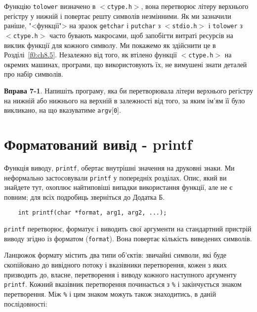 \documentclass[a4paper,12pt]{book}
\begin{document}
  Функцію \texttt{tolower} визначено в \texttt{\mbox{$<$}ctype.h\mbox{$>$}}, вона
  перетворює літеру верхнього регістру у нижній і повертає решту символів незмінними. Як
  ми зазначили раніше, "<функції"> на зразок \texttt{getchar} і \texttt{putchar} з
  \texttt{\mbox{$<$}stdio.h\mbox{$>$}} і \texttt{tolower} з
  \texttt{\mbox{$<$}ctype.h\mbox{$>$}} часто бувають макросами, щоб запобігти витраті
  ресурсів на виклик функції для кожного символу. Ми покажемо як здійснити це в
  Розділі~\ref{f0:ch8.5}. Незалежно від того, як втілено функції
  \texttt{\mbox{$<$}ctype.h\mbox{$>$}} на окремих машинах, програми, що використовують їх,
  не вимушені знати деталей про набір символів.
  
  \textbf{Вправа 7-1}. Напишіть програму, яка би перетворювала літери верхнього регістру
  на нижній або нижнього на верхній в залежності від того, за яким ім'ям її було
  викликано, на що вказуватиме \texttt{argv\mbox{$[$}0\mbox{$]$}}.

\section{Форматований вивід - printf}


  Функція виводу, \texttt{printf}, обертає внутрішні значення на друковні знаки. Ми
  неформально застосовували \texttt{printf} у попередніх розділах. Опис, який ви знайдете
  тут, охоплює найтиповіші випадки використання функції, але не є повним; для всіх
  подробиць зверніться до Додатка Б.
  \begin{verbatim}
    int printf(char *format, arg1, arg2, ...);
  \end{verbatim}

  \texttt{printf} перетворює, форматує і виводить свої аргументи на стандартний пристрій
  виводу згідно із форматом (\texttt{format}). Вона повертає кількість виведених символів.

  Ланцюжок формату містить два типи об'єктів: звичайні символи, які буде скопійовано до
  вивідного потоку і вказівники перетворення, кожен з яких призводить до, власне,
  перетворення і виводу кожного наступного аргументу \texttt{printf}. Кожний вказівник
  перетворення починається з \texttt{\%} і закінчується знаком перетворення. Між \texttt{\%}
  і цим знаком можуть також знаходитись, в даній послідовності:
    
\end{document}
